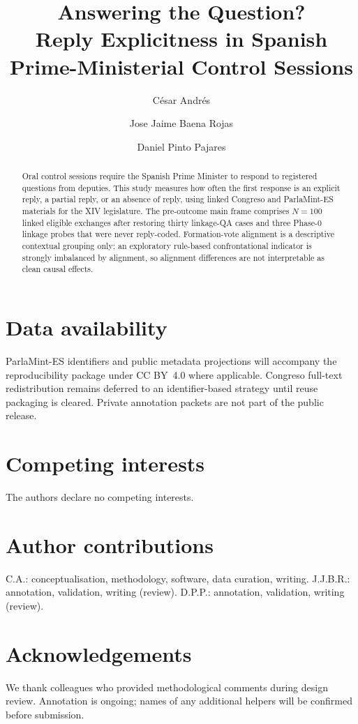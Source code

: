 \documentclass[11pt,a4paper]{article}
\title{Answering the Question?\\
  Reply Explicitness in Spanish Prime-Ministerial Control Sessions}
\author{%
  C\'{e}sar Andr\'{e}s \and
  Jose Jaime Baena Rojas \and
  Daniel Pinto Pajares%
}
\date{}
\begin{document}
\maketitle

\begin{abstract}
Oral control sessions require the Spanish Prime Minister to respond to
registered questions from deputies. This study measures how often the first
response is an explicit reply, a partial reply, or an absence of reply, using
linked Congreso and ParlaMint-ES materials for the XIV legislature. The
pre-outcome main frame comprises $N=100$ linked eligible exchanges after
restoring thirty linkage-QA cases and three Phase-0 linkage probes that were
never reply-coded. Formation-vote alignment is a descriptive contextual
grouping only; an exploratory rule-based confrontational indicator is
strongly imbalanced by alignment, so alignment differences are not
interpretable as clean causal effects.
\end{abstract}








\section*{Data availability}
ParlaMint-ES identifiers and public metadata projections will accompany the
reproducibility package under CC BY~4.0 where applicable. Congreso full-text
redistribution remains deferred to an identifier-based strategy until reuse
packaging is cleared. Private annotation packets are not part of the public
release.

\section*{Competing interests}
The authors declare no competing interests. %

\section*{Author contributions}
C.A.: conceptualisation, methodology, software, data curation, writing.
J.J.B.R.: annotation, validation, writing (review).
D.P.P.: annotation, validation, writing (review).

\section*{Acknowledgements}
We thank colleagues who provided methodological comments during design review.
Annotation is ongoing; names of any additional helpers will be confirmed before
submission.


\end{document}
